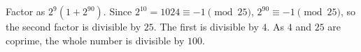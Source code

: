 Factor as $2^9(1+2^{90})$. Since $2^{10}=1024\equiv-1\pmod{25}$, $2^{90}\equiv-1\pmod{25}$, so the second factor is divisible by $25$. The first is divisible by $4$. As $4$ and $25$ are coprime, the whole number is divisible by $100$.
